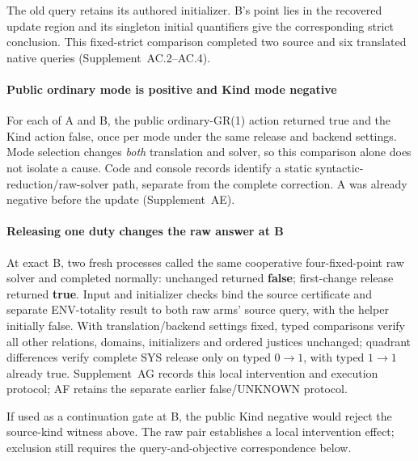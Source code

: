 The old query retains its authored initializer. B's point lies in the recovered
update region and its singleton initial quantifiers give the corresponding
strict conclusion. This fixed-strict comparison completed two source and
six translated native queries (Supplement~AC.2--AC.4).

\paragraph{Public ordinary mode is positive and Kind mode negative}
For each of A and B, the public ordinary-GR(1) action returned true and the
Kind action false, once per mode under the same release and backend
settings. Mode selection changes \emph{both} translation and solver, so
this comparison alone does not isolate a cause. Code and console records
identify a static syntactic-reduction/raw-solver path, separate from the
complete correction. A was already negative before the update
(Supplement~AE).

\paragraph{Releasing one duty changes the raw answer at B}
At exact B, two fresh processes called the same cooperative four-fixed-point
raw solver and completed normally: unchanged returned \textbf{false};
first-change release returned \textbf{true}. Input and initializer checks
bind the source certificate and separate ENV-totality result to both raw
arms' source query, with the helper initially false.
With translation/backend settings fixed, typed comparisons verify all other
relations, domains, initializers and ordered justices unchanged; quadrant
differences verify complete SYS release only on typed $0\to1$, with typed
$1\to1$ already true. Supplement~AG records this local intervention and
execution protocol; AF retains the separate earlier false/UNKNOWN protocol.

If used as a continuation gate at B, the public Kind negative would reject
the source-kind witness above. The raw pair establishes a local intervention
effect; exclusion still requires the query-and-objective correspondence below.
